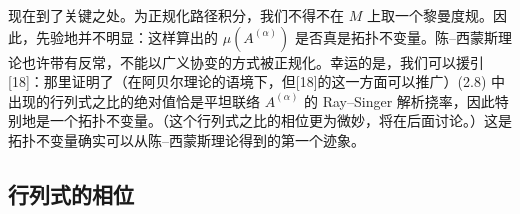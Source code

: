\documentclass[11pt,a4paper]{article}
\begin{document}

现在到了关键之处。为正规化路径积分，我们不得不在 $M$ 上取一个黎曼度规。因此，先验地并不明显：这样算出的 $\mu(A^{(\alpha)})$ 是否真是拓扑不变量。陈–西蒙斯理论也许带有反常，不能以广义协变的方式被正规化。幸运的是，我们可以援引[18]：那里证明了（在阿贝尔理论的语境下，但[18]的这一方面可以推广）(2.8) 中出现的行列式之比的绝对值恰是平坦联络 $A^{(\alpha)}$ 的 Ray--Singer 解析挠率，因此特别地是一个拓扑不变量。（这个行列式之比的相位更为微妙，将在后面讨论。）这是拓扑不变量确实可以从陈–西蒙斯理论得到的第一个迹象。

\subsection*{行列式的相位}
\end{document}
